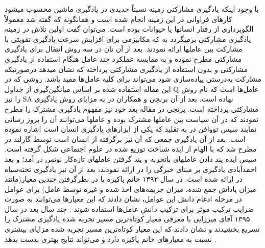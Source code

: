 \documentclass[12pt,a4paper]{article}
\begin{document}
با وجود اینکه یادگیری مشارکتی زمینه نسبتاً جدیدی در یادگیری ماشین محسوب میشود کارهای فراوانی در این زمینه انجام
شده است و همانگونه که گفته شد معمولاً الگوبرداری از رفتار انسانها یا حیوانات بوده است. می‌توان گفت اولین تلاش در زمینه
یادگیری مشارکتی برمیگردد به  که مکانیزمی برای افزایش سرعت یادگیری تقویتی با مشارکت بین عاملها ارائه نمودند.
بعد از آن تان در  سه روش انتقال برای یادگیری مشارکتی مطرح نموده و به مقایسه عملکرد چند عامل هنگام استفاده از یادگیری
مشارکتی و بدون استفاده از یادگیری مشارکتی پرداخته که نشان میدهد درصورتیکه مشارکت به‌درستی پیاده‌سازی شود می‌تواند
برای کلیه عامل‌ها مفید باشد. روشی که در این مقاله استفاده شده بر اساس میانگین‌گیری از جداول Q عامل‌ها است که نام روش را
نیز SA نهاده است. بعد از آن برنجی و همکاران در  به مزایای روش یادگیری مشارکتی پرداخته است.
برنجی در مقاله بعد خود
نیز مفهوم یادگیری مشترک را مطرح نمودند که در آن سیاست بین عاملها مشترک بوده و عاملها می‌توانند آن را بروز رسانی
نمایند  سپس تووافن در  به تقلید که یکی از ابزارهای یادگیری انسان است اشاره نموده است. بعد از آن یادگیری جمعی
که آن نیز برگرفته از انسان است توسط گارلند در  مطرح شد که با الهام از ایده شناخت توزیع شده در علوم اجتماعی شکل گرفته
است. سپس ایده پند دادن عاملهای باتجربه و پند گرفتن عاملهای تازه‌کار نونس در  آمد؛ و بعد احمدآبادی یادگیری بر مبنای
خبرگی را در  ارائه نمودند، بعد از آن نیز یادگیری تخته‌سیاه در  ارائه شده است.
در سال ۱۳۹۲ خانم پاکیزه با در نظرگرفتن چندین معیار(مانند میزان پاداش جمع شده، میزان جریمه‌های اخذ شده و غیره توسط عامل) برای عوامل در مرحله ادغام دانش این عوامل، نشان دادند که این معیارها می‌توانند به صورت ضرایب ترکیب موثر برای ترکیب دانش عامل‌ها استفاده شوند . چند سال بعد در سال ۱۳۹۵ آقای میرزایی با معرفی معیار کوتاه‌ترین مسیر تجربه شده یادگیری مشترک را تسریع بخشیدند و نشان دادند که این معیار کوتاه‌ترین مسیر تجریه شده مزایای بیشتری نسبت به معیارهای خانم پاکیزه دارد و می‌تواند نتایج بهتری بدست بدهد .
\end{document}
